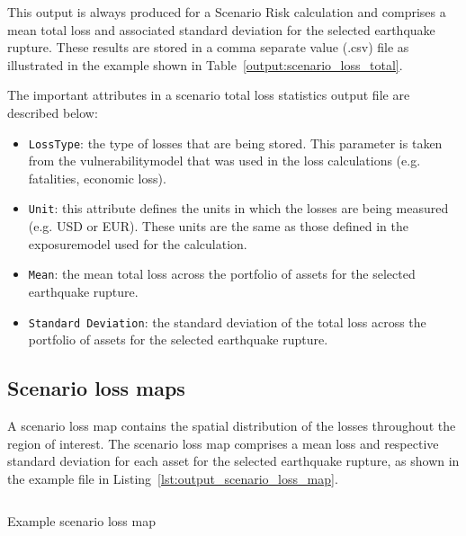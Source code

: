 This output is always produced for a Scenario Risk calculation and comprises a
mean total loss and associated standard deviation for the selected earthquake
rupture. These results are stored in a comma separate value (.csv) file as
illustrated in the example shown in Table~\ref{output:scenario_loss_total}.



The important attributes in a scenario total loss statistics output file are
described below:


\begin{itemize}

  \item \Verb+LossType+: the type of losses that are being stored. This
    parameter is taken from the \gls{vulnerabilitymodel} that was used in the
    loss calculations (e.g. fatalities, economic loss).

  \item \Verb+Unit+: this attribute defines the units in which the losses are
    being measured (e.g. USD or EUR). These units are the same as those defined
    in the \gls{exposuremodel} used for the calculation.

  \item \Verb+Mean+: the mean total loss across the portfolio of assets for the
    selected earthquake rupture.

  \item \Verb+Standard Deviation+: the standard deviation of the total loss 
    across the portfolio of assets for the selected earthquake rupture.

\end{itemize}


\subsection{Scenario loss maps}
\label{subsec:scenario_loss_map}

A scenario loss map contains the spatial distribution of the losses throughout
the region of interest. The scenario loss map comprises a mean loss and
respective standard deviation for each \gls{asset} for the selected earthquake
rupture, as shown in the example file in Listing~\ref{lst:output_scenario_loss_map}.

\begin{listing}[htbp]
  \inputminted[firstline=1,firstnumber=1,fontsize=\footnotesize,frame=single,bgcolor=lightgray]{xml}{oqum/risk/verbatim/output_scenario_loss_map.xml}
  \caption{Example scenario loss map}
  \label{lst:output_scenario_loss_map}
\end{listing}

